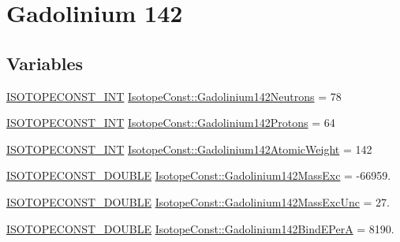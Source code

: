 \hypertarget{group___isotope_const-_gadolinium-_gd142}{}\section{Gadolinium 142}
\label{group___isotope_const-_gadolinium-_gd142}
\subsection*{Variables}
\begin{DoxyCompactItemize}
\item 
\mbox{\hyperlink{group___isotope_const-_macros_ga5f18360b3e99483a35c32d789e62621c}{I\+S\+O\+T\+O\+P\+E\+C\+O\+N\+S\+T\+\_\+\+I\+NT}} \mbox{\hyperlink{group___isotope_const-_gadolinium-_gd142_gab440843f50e5241b55a7535838bc3166}{Isotope\+Const\+::\+Gadolinium142\+Neutrons}} = 78
\item 
\mbox{\hyperlink{group___isotope_const-_macros_ga5f18360b3e99483a35c32d789e62621c}{I\+S\+O\+T\+O\+P\+E\+C\+O\+N\+S\+T\+\_\+\+I\+NT}} \mbox{\hyperlink{group___isotope_const-_gadolinium-_gd142_gab40909ba8f7ebab327fd0d47a4fae48f}{Isotope\+Const\+::\+Gadolinium142\+Protons}} = 64
\item 
\mbox{\hyperlink{group___isotope_const-_macros_ga5f18360b3e99483a35c32d789e62621c}{I\+S\+O\+T\+O\+P\+E\+C\+O\+N\+S\+T\+\_\+\+I\+NT}} \mbox{\hyperlink{group___isotope_const-_gadolinium-_gd142_ga6a06a53b4a87d355c2a4e9f3768c9738}{Isotope\+Const\+::\+Gadolinium142\+Atomic\+Weight}} = 142
\item 
\mbox{\hyperlink{group___isotope_const-_macros_ga8f45a7272ce02c0b4c65c44636ed719a}{I\+S\+O\+T\+O\+P\+E\+C\+O\+N\+S\+T\+\_\+\+D\+O\+U\+B\+LE}} \mbox{\hyperlink{group___isotope_const-_gadolinium-_gd142_gab940a62dc56779d9dcdc2188728bb0ae}{Isotope\+Const\+::\+Gadolinium142\+Mass\+Exc}} = -\/66959.
\item 
\mbox{\hyperlink{group___isotope_const-_macros_ga8f45a7272ce02c0b4c65c44636ed719a}{I\+S\+O\+T\+O\+P\+E\+C\+O\+N\+S\+T\+\_\+\+D\+O\+U\+B\+LE}} \mbox{\hyperlink{group___isotope_const-_gadolinium-_gd142_ga394adffcf00a8e82460e98b526640b6e}{Isotope\+Const\+::\+Gadolinium142\+Mass\+Exc\+Unc}} = 27.
\item 
\mbox{\hyperlink{group___isotope_const-_macros_ga8f45a7272ce02c0b4c65c44636ed719a}{I\+S\+O\+T\+O\+P\+E\+C\+O\+N\+S\+T\+\_\+\+D\+O\+U\+B\+LE}} \mbox{\hyperlink{group___isotope_const-_gadolinium-_gd142_ga792c1c6dec59dcadfd89eb7ef090b482}{Isotope\+Const\+::\+Gadolinium142\+Bind\+E\+PerA}} = 8190.

\end{DoxyCompactItemize}

